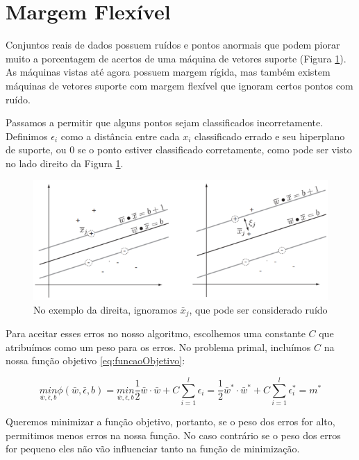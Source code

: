 \section{Margem Flexível}
Conjuntos reais de dados possuem ruídos e pontos anormais que podem piorar muito a porcentagem de acertos de uma máquina de vetores suporte (Figura \ref{fig:LABEL_FIG_6}). As máquinas vistas até agora possuem margem rígida, mas também existem máquinas de vetores suporte com margem flexível que ignoram certos pontos com ruído.

Passamos a permitir que alguns pontos sejam classificados incorretamente. Definimos $\epsilon_i$ como a distância entre cada $x_i$ classificado errado e seu hiperplano de suporte, ou $0$ se o ponto estiver classificado corretamente, como pode ser visto no lado direito da Figura \ref{fig:LABEL_FIG_6}.

\begin{figure}
  \centering
  \includegraphics[width=1\textwidth]{imagens/svm_6.png}
  \caption{No exemplo da direita, ignoramos $\bar{x}_j$, que pode ser considerado ruído \cite{art:LIVRO_SVM}}
  \label{fig:LABEL_FIG_6}
\end{figure}

Para aceitar esses erros no nosso algoritmo, escolhemos uma constante $C$ que atribuímos como um peso para os erros. No problema primal, incluímos $C$ na nossa função objetivo \ref{eq:funcaoObjetivo}:

\begin{equation}
    \underset{\bar{w}, \bar{\epsilon}, b}{min}\phi(\bar{w}, \bar{\epsilon},b)
    = \underset{\bar{w}, \bar{\epsilon}, b}{min}\frac{1}{2}\bar{w}\cdot\bar{w} + C\sum_{i=1}^l \epsilon_i
    = \frac{1}{2}\bar{w}^*\cdot\bar{w}^* + C\sum_{i=1}^l \epsilon_i^*
    =m^*
\end{equation}

Queremos minimizar a função objetivo, portanto, se o peso dos erros for alto, permitimos menos erros na nossa função. No caso contrário se o peso dos erros for pequeno eles não vão influenciar tanto na função de minimização.

